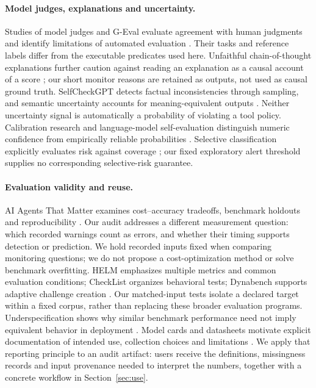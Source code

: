 \documentclass[10pt]{article}
\begin{document}
\paragraph{Model judges, explanations and uncertainty.}
Studies of model judges and G-Eval evaluate agreement with human judgments and identify limitations of automated evaluation \citep{zheng2023judge,liu2023geval}. Their tasks and reference labels differ from the executable predicates used here. Unfaithful chain-of-thought explanations further caution against reading an explanation as a causal account of a score \citep{turpin2023unfaithful}; our short monitor reasons are retained as outputs, not used as causal ground truth. SelfCheckGPT detects factual inconsistencies through sampling, and semantic uncertainty accounts for meaning-equivalent outputs \citep{manakul2023selfcheck,kuhn2023semantic}. Neither uncertainty signal is automatically a probability of violating a tool policy. Calibration research and language-model self-evaluation distinguish numeric confidence from empirically reliable probabilities \citep{guo2017calibration,kadavath2022know}. Selective classification explicitly evaluates risk against coverage \citep{geifman2017selective}; our fixed exploratory alert threshold supplies no corresponding selective-risk guarantee.

\paragraph{Evaluation validity and reuse.}
AI Agents That Matter examines cost--accuracy tradeoffs, benchmark holdouts and reproducibility \citep{kapoor2025agents}. Our audit addresses a different measurement question: which recorded warnings count as errors, and whether their timing supports detection or prediction. We hold recorded inputs fixed when comparing monitoring questions; we do not propose a cost-optimization method or solve benchmark overfitting. HELM emphasizes multiple metrics and common evaluation conditions; CheckList organizes behavioral tests; Dynabench supports adaptive challenge creation \citep{liang2022helm,ribeiro2020checklist,kiela2021dynabench}. Our matched-input tests isolate a declared target within a fixed corpus, rather than replacing these broader evaluation programs. Underspecification shows why similar benchmark performance need not imply equivalent behavior in deployment \citep{damour2022underspecification}. Model cards and datasheets motivate explicit documentation of intended use, collection choices and limitations \citep{mitchell2019modelcards,gebru2021datasheets}. We apply that reporting principle to an audit artifact: users receive the definitions, missingness records and input provenance needed to interpret the numbers, together with a concrete workflow in Section~\ref{sec:use}.
\end{document}
